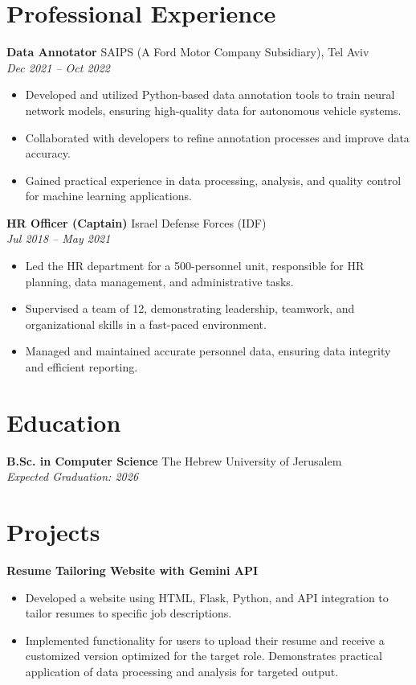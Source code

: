 \section*{Professional Experience}
\textbf{Data Annotator} \hfill SAIPS (A Ford Motor Company Subsidiary), Tel Aviv \\
\textit{Dec 2021 -- Oct 2022}
\begin{itemize}[noitemsep,nolistsep]
    \item Developed and utilized Python-based data annotation tools to train neural network models, ensuring high-quality data for autonomous vehicle systems.
    \item Collaborated with developers to refine annotation processes and improve data accuracy.
    \item Gained practical experience in data processing, analysis, and quality control for machine learning applications.
\end{itemize}

\textbf{HR Officer (Captain)} \hfill Israel Defense Forces (IDF) \\
\textit{Jul 2018 -- May 2021}
\begin{itemize}[noitemsep,nolistsep]
    \item Led the HR department for a 500-personnel unit, responsible for HR planning, data management, and administrative tasks.
    \item Supervised a team of 12, demonstrating leadership, teamwork, and organizational skills in a fast-paced environment.
    \item Managed and maintained accurate personnel data, ensuring data integrity and efficient reporting.
\end{itemize}


\section*{Education}
\textbf{B.Sc. in Computer Science} \hfill The Hebrew University of Jerusalem \\
\textit{Expected Graduation: 2026} \\


\section*{Projects}
\textbf{Resume Tailoring Website with Gemini API} \\
\begin{itemize}[noitemsep,nolistsep]
    \item Developed a website using HTML, Flask, Python, and API integration to tailor resumes to specific job descriptions.
    \item Implemented functionality for users to upload their resume and receive a customized version optimized for the target role. Demonstrates practical application of data processing and analysis for targeted output.
\end{itemize}

